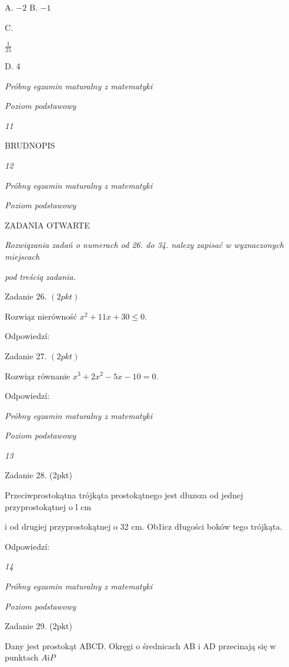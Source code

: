 \documentclass[a4paper,12pt]{article}
\begin{document}
A. $-2$ B. $-1$

C.

$\displaystyle \frac{1}{25}$

D. 4





{\it Próbny egzamin maturalny z matematyki}

{\it Poziom podstawowy}

{\it 11}

BRUDNOPIS





{\it 12}

{\it Próbny egzamin maturalny z matematyki}

{\it Poziom podstawowy}

ZADANIA OTWARTE

{\it Rozwiqzania zadań o numerach od 26. do 34. nalezy zapisać w wyznaczonych miejscach}

{\it pod treściq zadania}.

Zadanie 26. $(2pkt)$

Rozwiąz nierówność $x^{2}+11x+30\leq 0.$

Odpowiedzí:

Zadanie 27. $(2pkt)$

Rozwiąz równanie $x^{3}+2x^{2}-5x-10=0.$

Odpowiedzí:





{\it Próbny egzamin maturalny z matematyki}

{\it Poziom podstawowy}

{\it 13}

Zadanie 28. (2pkt)

Przeciwprostokątna trójkąta prostokątnego jest dłuzsza od jednej przyprostokątnej o l cm

i od drugiej przyprostokątnej o 32 cm. Ob1icz długości boków tego trójkąta.

Odpowiedzí:





{\it 14}

{\it Próbny egzamin maturalny z matematyki}

{\it Poziom podstawowy}

Zadanie 29. (2pkt)

Dany jest prostokąt ABCD. Okręgi o średnicach AB $\mathrm{i}$ AD przecinają się w punktach $A\mathrm{i}P$
\end{document}
